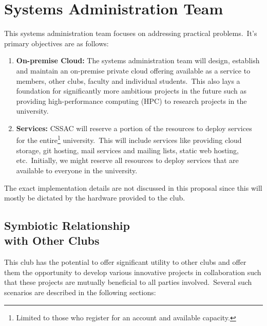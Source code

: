 \documentclass[11pt,twocolumn,oneside]{book}
\begin{document}
    \section{\large Systems Administration Team}\label{sec:systems-administration-team}
    This systems administration team focuses on addressing practical problems.\ It's primary objectives are as follows:
    \begin{enumerate}
        \item \textbf{On-premise Cloud:} The systems administration team will design, establish and maintain an
        on-premise private cloud offering available as a service to members, other clubs, faculty and individual
        students.\ This also lays a foundation for significantly more ambitious projects in the future such as providing
        high-performance computing (HPC) to research projects in the university.
        \item \textbf{Services:} CSSAC will reserve a portion of the resources to deploy services for the
        entire\footnote{Limited to those who register for an account and available capacity.} university.\ This will
        include services like providing cloud storage, git hosting, mail services and mailing lists, static web hosting,
        etc.\ Initially, we might reserve all resources to deploy services that are available to everyone in the
        university.
    \end{enumerate}
    The exact implementation details are not discussed in this proposal since this will mostly be dictated by the
    hardware provided to the club.


    \subsection[Symbiotic Relationship with Other Clubs]{Symbiotic Relationship \\ with Other Clubs}
    \label{subsec:symbiotic-relationship-with-other-clubs}
    This club has the potential to offer significant utility to other clubs and offer them the opportunity to develop
    various innovative projects in collaboration such that these projects are mutually beneficial to all parties
    involved.\ Several such scenarios are described in the following sections:
\end{document}
